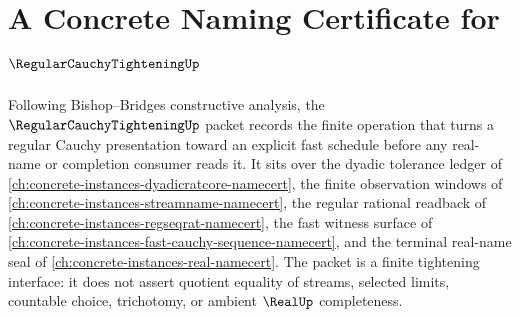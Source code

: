 \chapter{A Concrete Naming Certificate for $\RegularCauchyTighteningUp$}
\label{ch:concrete-instances-regular-cauchy-tightening-namecert}

Following Bishop--Bridges constructive analysis, the $\RegularCauchyTighteningUp$ packet records the finite operation that turns a regular Cauchy presentation toward an explicit fast schedule before any real-name or completion consumer reads it. It sits over the dyadic tolerance ledger of \autoref{ch:concrete-instances-dyadicratcore-namecert}, the finite observation windows of \autoref{ch:concrete-instances-streamname-namecert}, the regular rational readback of \autoref{ch:concrete-instances-regseqrat-namecert}, the fast witness surface of \autoref{ch:concrete-instances-fast-cauchy-sequence-namecert}, and the terminal real-name seal of \autoref{ch:concrete-instances-real-namecert}. The packet is a finite tightening interface: it does not assert quotient equality of streams, selected limits, countable choice, trichotomy, or ambient $\RealUp$ completeness.

